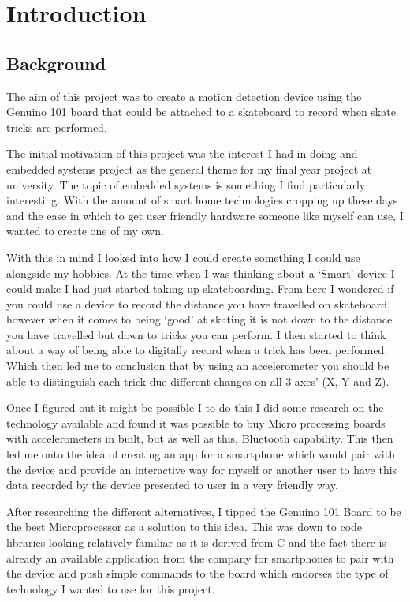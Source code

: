 \chapter{Introduction}\label{introduction}
\section{Background}
The aim of this project was to create a motion detection device using the Genuino 101 board that could be attached to a skateboard to record when skate tricks are performed. 

The initial motivation of this project was the interest I had in doing and embedded systems project as the general theme for my final year project at university. The topic of embedded systems is something I find particularly interesting. With the amount of smart home technologies cropping up these days and the ease in which to get user friendly hardware someone like myself can use, I wanted to create one of my own.  

With this in mind I looked into how I could create something I could use alongside my hobbies. At the time when I was thinking about a ‘Smart’ device I could make I had just started taking up skateboarding. From here I wondered if you could use a device to record the distance you have travelled on skateboard, however when it comes to being ‘good’ at skating it is not down to the distance you have travelled but down to tricks you can perform. I then started to think about a way of being able to digitally record when a trick has been performed. Which then led me to conclusion that by using an accelerometer you should be able to distinguish each trick due different changes on all 3 axes’ (X, Y and Z).

Once I figured out it might be possible I to do this I did some research on the technology available and found it was possible to buy Micro processing boards with accelerometers in built, but as well as this, Bluetooth capability. This then led me onto the idea of creating an app for a smartphone which would pair with the device and provide an interactive way for myself or another user to have this data recorded by the device presented to user in a very friendly way. 

After researching the different alternatives, I tipped the Genuino 101 Board to be the best Microprocessor as a solution to this idea. This was down to code libraries looking relatively familiar as it is derived from C and the fact there is already an available application from the company for smartphones to pair with the device and push simple commands to the board which endorses the type of technology I wanted to use for this project. 

